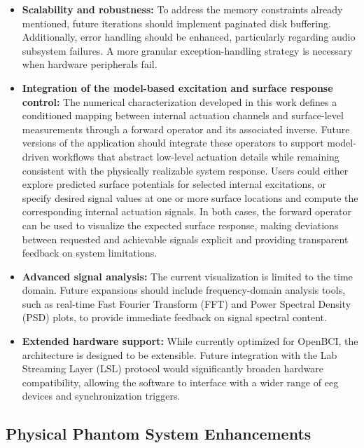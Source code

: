 \documentclass[../00_Main.tex]{subfiles}
\begin{document}
\begin{itemize}
    \item \textbf{Scalability and robustness:} To address the memory constraints already mentioned, future iterations should implement paginated disk buffering. Additionally, error handling should be enhanced, particularly regarding audio subsystem failures. A more granular exception-handling strategy is necessary when hardware peripherals fail.

    \item \textbf{Integration of the model-based excitation and surface response control:} The numerical characterization developed in this work defines a conditioned mapping between internal actuation channels and surface-level measurements through a forward operator and its associated inverse. Future versions of the application should integrate these operators to support model-driven workflows that abstract low-level actuation details while remaining consistent with the physically realizable system response.
    Users could either explore predicted surface potentials for selected internal excitations, or specify desired signal values at one or more surface locations and compute the corresponding internal actuation signals. In both cases, the forward operator can be used to visualize the expected surface response, making deviations between requested and achievable signals explicit and providing transparent feedback on system limitations.

    \item \textbf{Advanced signal analysis:} The current visualization is limited to the time domain. Future expansions should include frequency-domain analysis tools, such as real-time Fast Fourier Transform (FFT) and Power Spectral Density (PSD) plots, to provide immediate feedback on signal spectral content.

    \item \textbf{Extended hardware support:} While currently optimized for OpenBCI, the architecture is designed to be extensible. Future integration with the Lab Streaming Layer (LSL) protocol would significantly broaden hardware compatibility, allowing the software to interface with a wider range of \gls{eeg} devices and synchronization triggers.
\end{itemize}

\subsection{Physical Phantom System Enhancements}
\end{document}
